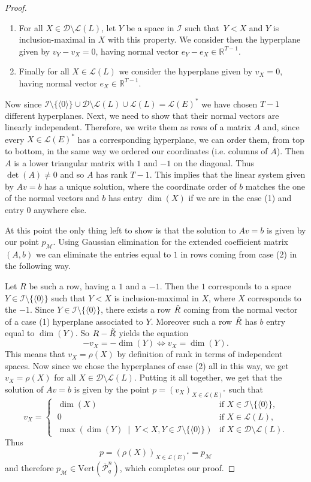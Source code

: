 \documentclass[a4paper,11pt,reqno]{amsart}
\theoremstyle{definition}
\newcommand{\mD}{\mathcal{D}}
\newcommand{\mM}{\mathcal{M}}
\newcommand{\mL}{\mathcal{L}}
\newcommand{\mI}{\mathcal{I}}
\newcommand{\la}{\langle}
\newcommand{\ra}{\rangle}
\newcommand{\rRP}{\bar{\mathcal{P}}_q^n}
\begin{document}
{\begin{proof}
\begin{enumerate}
        \item For all $X\in\mD\setminus\mL(L)$, let $Y$ be a space in $\mI$ such that~$Y<X$ and $Y$ is inclusion-maximal in $X$ with this property. We consider then the hyperplane given by $v_Y-v_X=0$, having normal vector $e_Y-e_X\in\mathbb{R}^{T-1}$.

        \item Finally for all $X\in\mL(L)$ we consider the hyperplane given by $v_X=0$, having normal vector $e_X\in\mathbb{R}^{T-1}$.
    \end{enumerate}

    Now since $\mI\setminus\{\la0\ra\}\cup\mD\setminus\mL(L)\cup\mL(L)=\mL(E)^\ast$ we have chosen $T-1$ different hyperplanes. Next, we need to show that their normal vectors are linearly independent. Therefore, we write them as rows of a matrix $A$ and, since every $X\in\mL(E)^\ast$ has a corresponding hyperplane, we can order them, from top to bottom, in the same way we ordered our coordinates (i.e. columns of $A$). Then $A$ is a lower triangular matrix with $1$ and $-1$ on the diagonal. Thus $\det(A)\ne 0$ and so $A$ has rank $T-1$. This implies that the linear system given by $Av=b$ has a unique solution, where the coordinate order of $b$ matches the one of the normal vectors and $b$ has entry $\dim(X)$ if we are in the case (1) and entry $0$ anywhere else.

    At this point the only thing left to show is that the solution to $Av=b$ is given by our point $p_\mM$. Using Gaussian elimination for the extended coefficient matrix $(A,b)$ we can eliminate the entries equal to $1$ in rows coming from  case (2) in the following way.

    Let $R$ be such a row, having a $1$ and a $-1$. Then the $1$ corresponds to a space $Y\in\mI\setminus\{\la0\ra\}$ such that $Y<X$ is inclusion-maximal in $X$, where $X$ corresponds to the $-1$. Since $Y\in\mI\setminus\{\la0\ra\}$, there exists a row $\Tilde{R}$ coming from the normal vector of a case (1) hyperplane associated to $Y$. Moreover such a row $\Tilde{R}$ has $b$ entry equal to $\dim(Y)$. So $R-\Tilde{R}$ yields the equation
    \[
        -v_X = -\dim(Y) \Longleftrightarrow v_X = \dim(Y).
    \]
    This means that $v_X = \rho(X)$ by definition of rank in terms of independent spaces. Now since we chose the hyperplanes of case (2) all in this way, we get $v_X =\rho(X)$ for all $X\in\mD\setminus\mL(L)$. Putting it all together, we get that the solution of $Av=b$ is given by the point $p=(v_X)_{X\in\mL(E)^\ast}$ such that
    \[
        v_X =
        \begin{cases}
        \;\dim(X)& \text{if } X\in\mI\setminus\{\la0\ra\},\\
        \;0& \text{if } X\in\mL(L),\\
        \;\max(\dim(Y)\;\mid\;Y<X,Y\in\mI\setminus\{\la0\ra\})& \text{if } X\in\mD\setminus\mL(L).
        \end{cases}
    \]
    Thus
    \[
        p=(\rho(X))_{X\in\mL(E)^\ast}=p_\mM
    \]
    and therefore $p_\mM\in\text{Vert}(\rRP)$, which completes our proof.
\end{proof}

}
\end{document}
